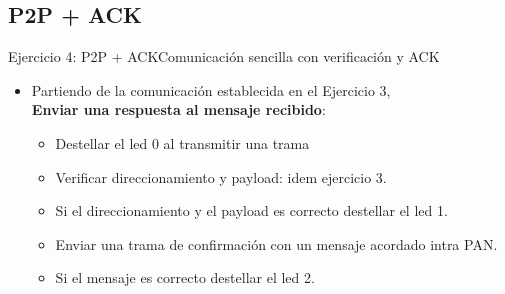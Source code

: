 \documentclass[aspectratio=169,handout]{beamer}
\begin{document}
\subsection[P2P+ACK]{P2P + ACK}
\begin{frame}[t]{Ejercicio 4: P2P + ACK}{Comunicación sencilla con verificación y ACK}
    \begin{itemize}
        \item Partiendo de la comunicación establecida en el Ejercicio 3,\\ \textbf{Enviar una respuesta al mensaje recibido}:
        \vspace{10px}
            \begin{itemize}
            \item Destellar el led 0 al transmitir una trama
            \vspace{5px}
            \item Verificar direccionamiento y payload: idem ejercicio 3.
            \vspace{5px}
            \item Si el direccionamiento y el payload es correcto destellar el led 1.
			\vspace{5px}
            \item Enviar una trama de confirmación con un mensaje acordado intra PAN.
            \vspace{5px}
			\item Si el mensaje es correcto destellar el led 2. 
            \end{itemize}
        \vspace{5px}
    \end{itemize}   
\end{frame}

\end{document}
